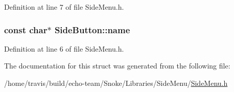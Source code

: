 Definition at line 7 of file Side\-Menu.\-h.

\hypertarget{struct_side_button_a2533e6acfd5ba40cb7717412c25e6a0c}{
\subsubsection[{name}]{\setlength{\rightskip}{0pt plus 5cm}const char$\ast$ Side\-Button\-::name}}\label{struct_side_button_a2533e6acfd5ba40cb7717412c25e6a0c}


Definition at line 6 of file Side\-Menu.\-h.



The documentation for this struct was generated from the following file\-:\begin{DoxyCompactItemize}
\item 
/home/travis/build/echo-\/team/\-Snoke/\-Libraries/\-Side\-Menu/\hyperlink{_side_menu_8h}{Side\-Menu.\-h}\end{DoxyCompactItemize}
